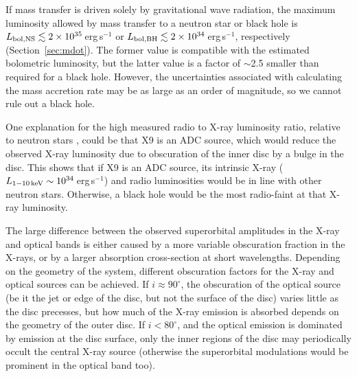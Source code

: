 \documentclass[a4paper,fleqn,usenatbib]{mnras}
\begin{document}
If mass transfer is driven solely by gravitational wave radiation, the maximum luminosity allowed by mass transfer to a neutron star or black hole is $L_{\rm bol, NS} \lesssim 2\times 10^{35}$\,erg\,s$^{-1}$ or $L_{\rm bol, BH} \lesssim 2 \times 10^{34}$\,erg\,s$^{-1}$, respectively (Section~\ref{sec:mdot}). The former value is compatible with the estimated bolometric luminosity, but the latter value is a factor of $\sim$2.5 smaller than required for a black hole. However, the uncertainties associated with calculating the mass accretion rate may be as large as an order of magnitude, so we cannot rule out a black hole.

One explanation for the high measured radio to X-ray luminosity ratio, relative to neutron stars \citep{2015MNRAS.453.3918M, 2017MNRAS.467.2199B}, could be that X9 is an ADC source, which would reduce the observed X-ray luminosity due to obscuration of the inner disc by a bulge in the disc. This shows that if X9 is an ADC source, its intrinsic X-ray ($L_{\rm 1-10\,keV} \sim 10^{34}$\,erg\,s$^{-1}$) and radio luminosities would be in line with other neutron stars. Otherwise, a black hole would be the most radio-faint at that X-ray luminosity.

The large difference between the observed superorbital amplitudes in the X-ray and optical bands is either caused by a more variable obscuration fraction in the X-rays, or by a larger absorption cross-section at short wavelengths. Depending on the geometry of the system, different obscuration factors for the X-ray and optical sources can be achieved. If $i \approx 90^\circ$, the obscuration of the optical source (be it the jet or edge of the disc, but not the surface of the disc) varies little as the disc precesses, but how much of the X-ray emission is absorbed depends on the geometry of the outer disc. If $i < 80^\circ$, and the optical emission is dominated by emission at the disc surface, only the inner regions of the disc may periodically occult the central X-ray source (otherwise the superorbital modulations would be prominent in the optical band too).
\end{document}
